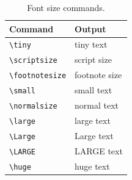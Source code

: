 \begin{table}[H]
	\centering
	\caption{Font size commands.}
	\label{tab:fonts-size}
	\begin{tabular}{@{}ll@{}}
		\toprule
		Command & Output \\
		\midrule
		\texttt{\textbackslash tiny}         & {\tiny         tiny text}         \\
		\texttt{\textbackslash scriptsize}   & {\scriptsize   script size}       \\
		\texttt{\textbackslash footnotesize} & {\footnotesize footnote size}     \\
		\texttt{\textbackslash small}        & {\small        small text}        \\
		\texttt{\textbackslash normalsize}   & {\normalsize   normal text}       \\
		\texttt{\textbackslash large}        & {\large        large text}        \\
		\texttt{\textbackslash Large}        & {\Large        Large text}        \\
		\texttt{\textbackslash LARGE}        & {\LARGE        LARGE text}        \\
		\texttt{\textbackslash huge}         & {\huge         huge text}         \\
		\bottomrule
	\end{tabular}
\end{table}

